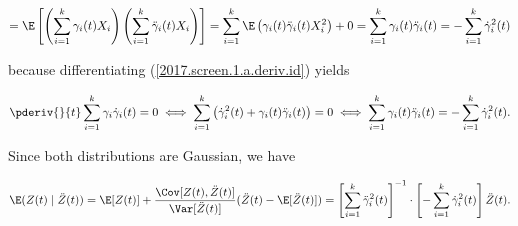 \begin{solution}
\begin{enumerate}[(a)]
\[
= \E \left[  \left(  \sum_{i=1}^k \gamma_i(t) X_i   \right) \left( \sum_{i=1}^k   \ddot{\gamma}_i(t) X_i  \right)  \right] = \sum_{i=1}^k \E \left( \gamma_i(t)  \ddot{\gamma}_i(t)  X_i^2 \right) + 0 = \sum_{i=1}^k \gamma_i(t)  \ddot{\gamma}_i(t) = -\sum_{i=1}^k \dot{\gamma}_i^2(t) 
\]
 
because  differentiating (\ref{2017.screen.1.a.deriv.id}) yields

\[
\pderiv{}{t} \sum_{i=1}^k \gamma_i \dot{\gamma}_i(t) = 0  \iff \sum_{i=1}^k \left( \dot{\gamma}_i^2(t) + \gamma_i(t) \ddot{\gamma}_i(t) \right) = 0 \iff  \sum_{i=1}^k  \gamma_i(t) \ddot{\gamma}_i(t) = -\sum_{i=1}^k \dot{\gamma}_i^2(t) .
\]

Since both distributions are Gaussian, we have

\[
 \E(Z(t) \mid \ddot{Z}(t)) =  \E[Z(t)] + \frac{\Cov[ Z(t), \ddot{Z}(t)] }{ \Var[\ddot{Z}(t)]} ( \ddot{Z}(t) - \E[ \ddot{Z}(t)] )  =  \left[ \sum_{i=1}^k \ddot{\gamma}_i^2(t) \right]^{-1} \cdot \left[ -\sum_{i=1}^k \dot{\gamma}_i^2(t) \right]  \ddot{Z}(t).
 \]
 
%
%
%
%
%
%
%
%

\end{enumerate}


\end{solution}


